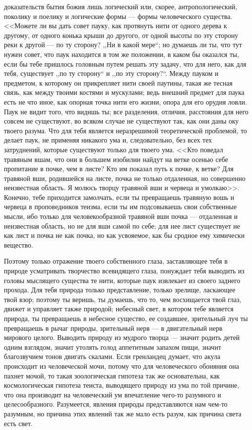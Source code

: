 \documentclass[12pt]{article}
\begin{document}
доказательств бытия божия лишь логический или, скорее, антропологический, поколику и поелику и логические формы --- формы человеческого существа. <<Можете ли вы дать совет пауку, как протянуть нити от одного дерева к другому, от одного конька крыши до другого, от одной высоты по эту сторону реки к другой --- по ту сторону? ,,Ни в какой мере``; но думаешь ли ты, что тут нужен совет, что паук находится в том же положении, в каком бы оказался ты, если бы тебе пришлось головным путем решать эту задачу, что для него, как для тебя, существует ,,по ту сторону`` и ,,по эту сторону?``. Между пауком и предметом, к которому он прикрепляет нити своей паутины, такая же тесная связь, как между твоими костями и мускулами; ведь внешний предмет для паука есть не что иное, как опорная точка нити его жизни, опора для его орудия ловли. Паук не видит того, что видишь ты; все разделения, отличия, расстояния для него совсем не существуют, во всяком случае не существуют так, как они даны оку твоего разума. Что для тебя является неразрешимой теоретической проблемой, то делает паук, не применяя никакого ума и, следовательно, без всех тех затруднений, которые существуют только для твоего ума. <<Кто поведал травяным вшам, что они в большем изобилии найдут на ветке осенью себе пропитание в почке, чем в листе? Кто им показал путь к почке, к ветке? Для травяной вши, родившейся на листе, почка не только отдаленная, но совершенно неизвестная область. Я молюсь творцу травяной вши и червеца и умолкаю>>. Конечно, тебе приходится замолчать, если ты превращаешь травяную вошь и червеца в проповедников теизма, если ты им подсовываешь свои собственные мысли, ибо только для человекообразной травяной вши почка --- отдаленная и неизвестная область, но не для вши самой по себе; для нее лист существует не как лист и почка не как почка, но как усвояемое, как бы сродное ему химически вещество.

Поэтому только отражение твоего собственного глаза, заставляющее тебя в природе усматривать творчество всевидящего глаза, понуждает тебя выводить из головы мыслящего существа те нити, которые паук извлекает из своего заднего прохода. Для тебя природа только представление, только зрелище, ласкающее твой взор; поэтому ты веришь, ты думаешь, что то, чем восхищается твой глаз, движет и управляет также природой; небесный свет, в котором тебе является природа, ты превращаешь в небесное существо, ее создавшее, зрительный луч ты превращаешь в рычаг природы, зрительный нерв --- в двигательный нерв мирового целого. Выводить природу из мудрого творца --- значит родить детей одним взглядом, значит утолять голод аппетитным запахом пищи, значит благозвучием тонов двигать скалами. Если гренландец думает, что акула происходит из человеческой мочи, потому что для человеческого обоняния она пахнет мочой, то такая зоологическая гипотеза так же основательна, как космологическая гипотеза теиста, выводящего природу из ума по той причине, что она производит на человеческий ум впечатление чего-то разумного и целесообразного. Разумеется, явления природы представляются нам чем-то разумным, но причина этих явлений так же мало есть разум, как причина света есть свет.
\end{document}
